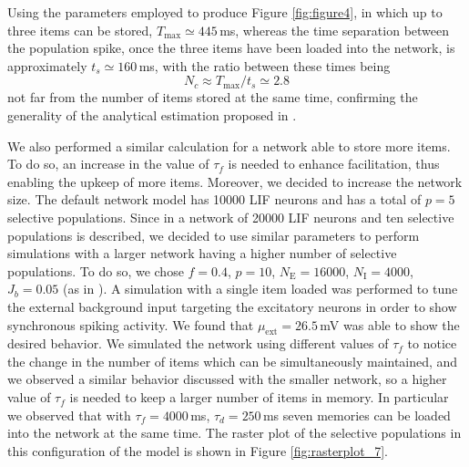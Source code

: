 \documentclass[a4paper, 12pt, twoside, openright]{book}
\begin{document}
Using the parameters employed to produce Figure \ref{fig:figure4}, in which up to three items can be stored, $T_{\text{max}}\simeq 445$\,ms, whereas the time separation between the population spike, once the three items have been loaded into the network, is approximately $t_s \simeq 160$\,ms, with the ratio between these times being $$N_c\approx T_{\text{max}}/t_s\simeq 2.8$$ not far from the number of items stored at the same time, confirming the generality of the analytical estimation proposed in \cite{mi_katkov_tsodyks2017}.


We also performed a similar calculation for a network able to store more items. To do so, an increase in the value of $\tau_f$ is needed to enhance facilitation, thus enabling the upkeep of more items. Moreover, we decided to increase the network size. The default network model has 10000 LIF neurons and has a total of $p=5$ selective populations. Since in \cite{mi_katkov_tsodyks2017} a network of 20000 LIF neurons and ten selective populations is described, we decided to use similar parameters to perform simulations with a larger network having a higher number of selective populations. To do so, we chose $f=0.4$, $p=10$, $N_{\text{E}}=16000$, $N_{\text{I}}=4000$, $J_b = 0.05$ (as in \cite{mi_katkov_tsodyks2017}). A simulation with a single item loaded was performed to tune the external background input targeting the excitatory neurons in order to show synchronous spiking activity. We found that $\mu_{\text{ext}}=26.5$\,mV was able to show the desired behavior. We simulated the network using different values of $\tau_f$ to notice the change in the number of items which can be simultaneously maintained, and we observed a similar behavior discussed with the smaller network, so a higher value of $\tau_f$ is needed to keep a larger number of items in memory. In particular we observed that with $\tau_f = 4000$\,ms, $\tau_d = 250$\,ms seven memories can be loaded into the network at the same time. The raster plot of the selective populations in this configuration of the model is shown in Figure \ref{fig:rasterplot_7}.
\end{document}
